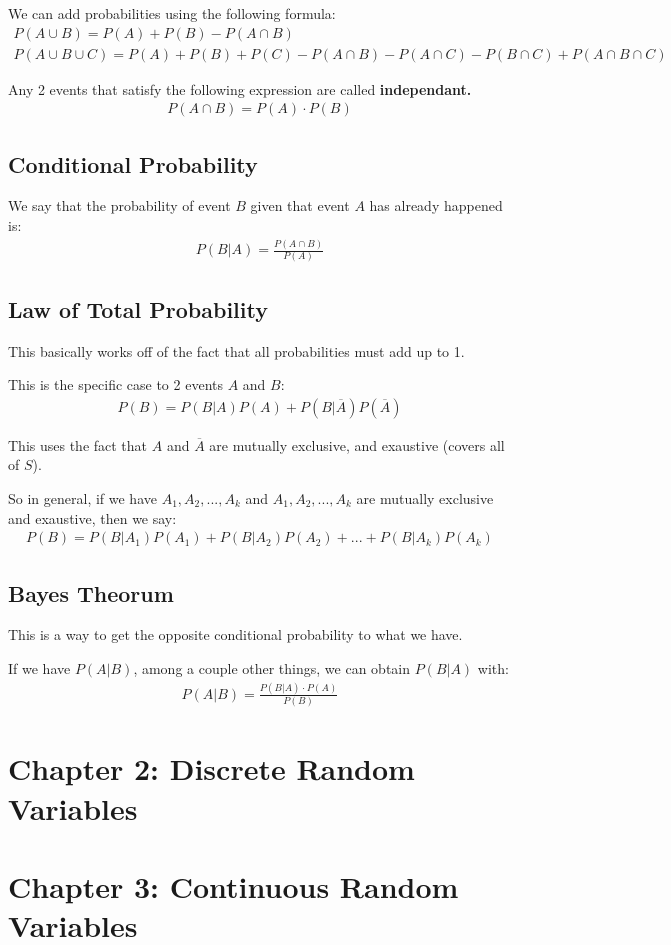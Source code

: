 \documentclass[12pt,letterpaper]{article} \usepackage{amsmath} \usepackage{graphicx} \usepackage[margin=1in]{geometry} \usepackage{longtable}  \usepackage{amssymb}
\begin{document}
	We can add probabilities using the following formula:
	\begin{align*}
		P(A\cup B) = P(A) + P(B) - P(A\cap B) \\
		P(A\cup B \cup C) = P(A)+P(B)+P(C)-P(A\cap B) - P(A\cap C) - P(B\cap C) + P(A\cap B\cap C)
	\end{align*}

	Any 2 events that satisfy the following expression are called \textbf{independant. }
	\begin{align*}
		P(A\cap B) = P(A)\cdot P(B)
	\end{align*}

	\subsection{Conditional Probability}
	We say that the probability of event $B$ given that event $A$ has already happened is:
	\begin{align*}
		P(B|A) = \frac{P(A\cap B)}{P(A)}
	\end{align*}
	
	\subsection{Law of Total Probability}
	This basically works off of the fact that all probabilities must add up to 1. 
	
	This is the specific case to 2 events $A$ and $B$:
	\begin{align*}
		P(B) = P(B|A)P(A) + P(B|\overline A)P(\overline A)
	\end{align*}

	This uses the fact that $A$ and $\overline A$ are mutually exclusive, and exaustive (covers all of $S$). 
	
	So in general, if we have $A_1, A_2, ..., A_k$ and $A_1, A_2, ..., A_k$ are mutually exclusive and exaustive, then we say:
	\begin{align*}
		P(B) = P(B|A_1)P(A_1) + P(B|A_2)P(A_2) + ... + P(B|A_k)P(A_k)
	\end{align*}
	
	\subsection{Bayes Theorum}
	This is a way to get the opposite conditional probability to what we have. 
	
	If we have $P(A|B)$, among a couple other things, we can obtain $P(B|A)$ with:
	\begin{align*}
		P(A|B) = \frac{P(B|A)\cdot P(A)}{P(B)}
	\end{align*}
	
	\section{Chapter 2: Discrete Random Variables}
	
	\section{Chapter 3: Continuous Random Variables}
	
\end{document}
